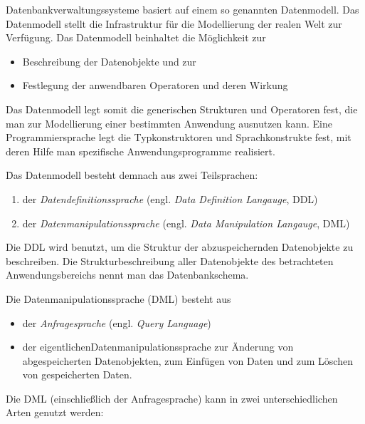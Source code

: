 Datenbankverwaltungssysteme basiert auf einem so genannten Datenmodell. Das Datenmodell stellt die Infrastruktur für die Modellierung der realen Welt zur Verfügung. Das Datenmodell beinhaltet die Möglichkeit zur 

\begin{itemize}
\item Beschreibung der Datenobjekte und zur
\item Festlegung der anwendbaren Operatoren und deren Wirkung
\end{itemize}

Das Datenmodell legt somit die generischen Strukturen und Operatoren fest, die man zur Modellierung einer bestimmten Anwendung ausnutzen kann. Eine Programmiersprache legt die Typkonstruktoren und Sprachkonstrukte fest, mit deren Hilfe man spezifische Anwendungsprogramme realisiert. 

\begin{tabbing}
\qquad \= Das Datenmodell besteht demnach aus zwei Teilsprachen: 
\end{tabbing}

\begin{enumerate}
\item der \textit{Datendefinitionssprache} (engl. \textit{Data Definition Langauge}, DDL)
\item der \textit{Datenmanipulationssprache} (engl. \textit{Data Manipulation Langauge}, DML)
\end{enumerate}

Die DDL wird benutzt, um die Struktur der abzuspeichernden Datenobjekte zu beschreiben. Die Strukturbeschreibung aller Datenobjekte des betrachteten Anwendungsbereichs nennt man das Datenbankschema. 

\begin{tabbing}
\qquad \= Die Datenmanipulationssprache (DML) besteht aus
\end{tabbing}

\begin{itemize}
\item der \textit{Anfragesprache} (engl. \textit{Query Language})
\item der \glqq eigentlichen\grqq Datenmanipulationssprache zur Änderung von abgespeicherten Datenobjekten, zum Einfügen von Daten und zum Löschen von gespeicherten Daten.
\end{itemize}

Die DML (einschließlich der Anfragesprache) kann in zwei unterschiedlichen Arten genutzt werden:

